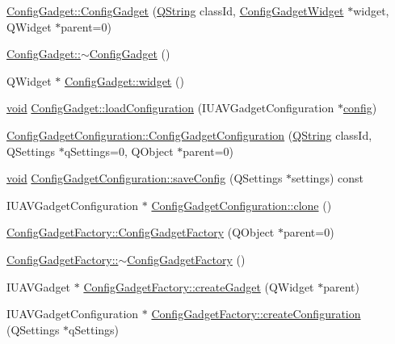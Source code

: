 \begin{DoxyCompactItemize}
\item 
\hyperlink{group___config_plugin_gae5427c3bad5fe19de2f24710fd629d87}{Config\-Gadget\-::\-Config\-Gadget} (\hyperlink{group___u_a_v_objects_plugin_gab9d252f49c333c94a72f97ce3105a32d}{Q\-String} class\-Id, \hyperlink{class_config_gadget_widget}{Config\-Gadget\-Widget} $\ast$widget, Q\-Widget $\ast$parent=0)
\item 
\hyperlink{group___config_plugin_ga6fbabaaacad7e51739c18053d5aa83fd}{Config\-Gadget\-::$\sim$\-Config\-Gadget} ()
\item 
Q\-Widget $\ast$ \hyperlink{group___config_plugin_ga678f4bf881dd4095ab62f66d69c32546}{Config\-Gadget\-::widget} ()
\item 
\hyperlink{group___u_a_v_objects_plugin_ga444cf2ff3f0ecbe028adce838d373f5c}{void} \hyperlink{group___config_plugin_ga43acf4e389daaf28085a3773b4abc903}{Config\-Gadget\-::load\-Configuration} (I\-U\-A\-V\-Gadget\-Configuration $\ast$\hyperlink{deflate_8c_a4473b5227787415097004fd39f55185e}{config})
\item 
\hyperlink{group___config_plugin_ga60e6c6cfd7819f53b6a76447ba34d774}{Config\-Gadget\-Configuration\-::\-Config\-Gadget\-Configuration} (\hyperlink{group___u_a_v_objects_plugin_gab9d252f49c333c94a72f97ce3105a32d}{Q\-String} class\-Id, Q\-Settings $\ast$q\-Settings=0, Q\-Object $\ast$parent=0)
\item 
\hyperlink{group___u_a_v_objects_plugin_ga444cf2ff3f0ecbe028adce838d373f5c}{void} \hyperlink{group___config_plugin_ga6b1f86f80d200736d29b69452e329040}{Config\-Gadget\-Configuration\-::save\-Config} (Q\-Settings $\ast$settings) const 
\item 
I\-U\-A\-V\-Gadget\-Configuration $\ast$ \hyperlink{group___config_plugin_gac237bebed60ca183ae60b2b4598acc47}{Config\-Gadget\-Configuration\-::clone} ()
\item 
\hyperlink{group___config_plugin_ga7785d39aeb34203184e554b3f3efda71}{Config\-Gadget\-Factory\-::\-Config\-Gadget\-Factory} (Q\-Object $\ast$parent=0)
\item 
\hyperlink{group___config_plugin_gad9021aa0495e8db3dbaf86f04d7ae1e1}{Config\-Gadget\-Factory\-::$\sim$\-Config\-Gadget\-Factory} ()
\item 
I\-U\-A\-V\-Gadget $\ast$ \hyperlink{group___config_plugin_ga0a27d1d7799dadf3e68617090af3054c}{Config\-Gadget\-Factory\-::create\-Gadget} (Q\-Widget $\ast$parent)
\item 
I\-U\-A\-V\-Gadget\-Configuration $\ast$ \hyperlink{group___config_plugin_gad4b30018cb53b866caf602b7f5409b0c}{Config\-Gadget\-Factory\-::create\-Configuration} (Q\-Settings $\ast$q\-Settings)

\end{DoxyCompactItemize}
